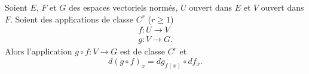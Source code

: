 \begin{theorem}    \label{ThoAGXGuEt}
    Soient \( E\), \( F\) et \( G\) des espaces vectoriels normés, \( U\) ouvert dans \( E\) et \( V\) ouvert dans \( F\). Soient des applications de classe \( C^r\) (\( r\geq 1\))
    \begin{subequations}
        \begin{align}
            f\colon U\to V\\
            g\colon V\to G.
        \end{align}
    \end{subequations}
    Alors l'application \( g\circ f\colon V\to G\) est de classe \( C^r\) et
    \begin{equation}\label{EqHFmezmr}
        d(g\circ f)_x=dg_{f(x)}\circ df_x.
    \end{equation}
\end{theorem}

